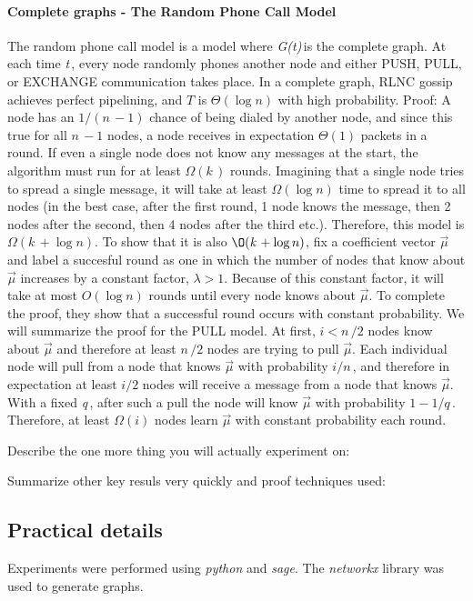 \documentclass{article} %
\def\numNodes{\textit{n}\,}
\def\graph{\textit{G(t)}\,}
\def\graphtime{\textit{t}\,}
\def\numMessages{\textit{k}\,}
\def\fieldSize{\textit{q}\,}
\begin{document}
\paragraph{Complete graphs - The Random Phone Call Model}
The random phone call model is a model where \graph is the complete graph. At each time \graphtime, every node randomly phones another node and either PUSH, PULL, or EXCHANGE communication takes place.  In a complete graph, RLNC gossip achieves perfect pipelining, and $T$ is $\Theta(\log{n})$ with high probability. 
Proof: A node has an $1/(\numNodes-1)$ chance of being dialed by another node, and since this true for all $\numNodes-1$ nodes, a node receives in expectation $\Theta(1)$ packets in a round. If even a single node does not know any messages at the start, the algorithm must run for at least $\Omega(\numMessages)$ rounds. Imagining that a single node tries to spread a single message, it will take at least $\Omega(\log{n})$ time to spread it to all nodes (in the best case, after the first round, 1 node knows the message, then 2 nodes after the second, then 4 nodes after the third etc.). Therefore, this model is $\Omega(\numMessages + \log{n})$. To show that it is also $\O(\numMessages + \log{n})$, fix a coefficient vector $\vec{\mu}$ and label a succesful round as one in which the number of nodes that know about $\vec{\mu}$ increases by a constant factor, $\lambda > 1$. Because of this constant factor, it will take at most $O(\log{n})$ rounds until every node knows about $\vec{\mu}$. To complete the proof, they show that a successful round occurs with constant probability. We will summarize the proof for the PULL model. At first, $i < \numNodes/2$ nodes know about $\vec{\mu}$ and therefore at least $\numNodes/2$ nodes are trying to pull $\vec{\mu}$. Each individual node will pull from a node that knows $\vec{\mu}$ with probability $i/\numNodes$, and therefore in expectation at least $i/2$ nodes will receive a message from a node that knows $\vec{\mu}$. With a fixed \fieldSize, after such a pull the node will know $\vec{\mu}$ with probability $1-1/\fieldSize$.  Therefore, at least $\Omega(i)$ nodes learn $\vec{\mu}$ with constant probability each round. 

Describe the one more thing you will actually experiment on: 

Summarize other key resuls very quickly and proof techniques used:


\subsection{Practical details}
Experiments were performed using \textit{python} and \textit{sage}. The \textit{networkx} library was used to generate graphs.
\end{document}
